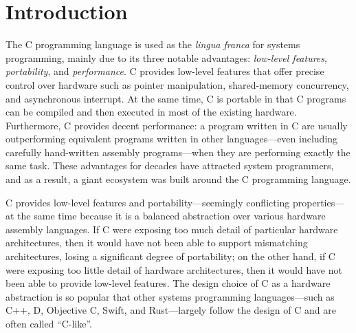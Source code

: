 \section{Introduction}
\label{sec:introduction}

The C programming language is used as the \emph{lingua franca} for systems programming, mainly due
to its three notable advantages: \emph{low-level features}, \emph{portability}, and
\emph{performance}.  C provides low-level features that offer precise control over hardware such as
pointer manipulation, shared-memory concurrency, and asynchronous interrupt.  At the same time, C is
portable in that C programs can be compiled and then executed in most of the existing hardware.
Furthermore, C provides decent performance: a program written in C are usually outperforming
equivalent programs written in other languages---even including carefully hand-written assembly
programs---when they are performing exactly the same task.  These advantages for decades have
attracted system programmers, and as a result, a giant ecosystem was built around the C programming
language.

C provides low-level features and portability---seemingly conflicting properties---at the same time
because it is a balanced abstraction over various hardware assembly languages.  If C were exposing
too much detail of particular hardware architectures, then it would have not been able to support
mismatching architectures, losing a significant degree of portability; on the other hand, if C were
exposing too little detail of hardware architectures, then it would have not been able to provide
low-level features.  The design choice of C as a hardware abstraction is so popular that other
systems programming languages---such as C++, D, Objective C, Swift, and Rust---largely follow the
design of C and are often called ``C-like''.





